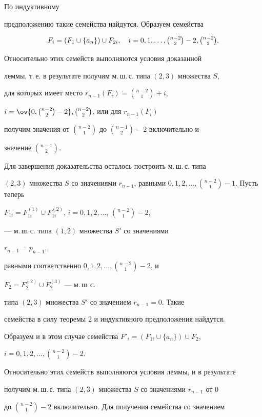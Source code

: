 \begin{pf}
По индуктивному 


предположению такие семейства найдутся. Образуем семейства 


$$ 


F_i=(F_1\cup\{a_n\})\cup F_{2i},\quad 


i=0,1,\dotsc,\tbinom{n-2}{2}-2,\tbinom{n-2}{2}. 


$$ 


Относительно этих семейств выполняются условия доказанной 


леммы, т.\,е. в результате получим м.\,ш.\,с. типа $(2,3)$ множества $S$, 


для которых имеет место $r_{n-1}(F_i)=\binom{n-2}{1}+i$, 


$i=\ov{0,\binom{n-2}{2}-2},\binom{n-2}{2}$, или для $r_{n-1}(F_i)$ 


получим значения от $\binom{n-2}{1}$ до $\binom{n-1}{2}-2$ включительно и 


значение $\binom{n-1}{2}$. 


Для завершения доказательства осталось построить м.\,ш.\,с. типа 


$(2,3)$ множества $S$ со значениями $r_{n-1}$, равными $0,1,2,\dotsc, 


\binom{n-2}{1}-1$. Пусть теперь 


$F_{1i}=F_{1i}^{(1)}\cup F_{1i}^{(2)}$, $i=0,1,2,\dotsc$, $\binom{n-2}{1}-2$, 


--- м.\,ш.\,с. типа $(1,2)$ множества $S'$ со значениями 


$r_{n-1}=p_{n-1}$, 


равными соответственно $0,1,2,\dotsc, \binom{n-2}{1}-2$, и 


$F_2=F_2^{(2)}\cup F_2^{(3)}$ --- м.\,ш.\,с. 


типа $(2,3)$ множества $S'$ со значением $r_{n-1}=0$. Такие 


семейства в силу теоремы 2 и индуктивного предположения найдутся. 


Образуем и в этом случае семейства $F'_i=(F_{1i}\cup\{a_n\})\cup F_2$, 


$i=0,1,2,\dotsc, \binom{n-2}{1}-2$. 


 


Относительно этих семейств выполняются условия леммы, и в результате 


получим м.\,ш.\,с. типа $(2,3)$ множества $S$ со значениями $r_{n-1}$ от 0 


до $\binom{n-2}{1}-2$ включительно. Для получения семейства со значением 



\end{pf}
